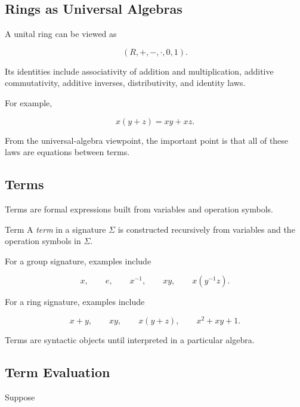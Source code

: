 \subsection{Rings as Universal Algebras}
\label{subsec:rings-universal-algebras}

A unital ring can be viewed as

\[ (R,+,-,\cdot,0,1). \]

Its identities include associativity of addition and multiplication,
additive commutativity, additive inverses, distributivity, and identity
laws.

For example,

\[ x(y+z)=xy+xz. \]

From the universal-algebra viewpoint, the important point is that all of
these laws are equations between terms.

\subsection{Terms}
\label{subsec:universal-terms}

Terms are formal expressions built from variables and operation symbols.

\begin{definitionbox}{Term}
A \emph{term} in a signature \(\Sigma\) is constructed recursively from
variables and the operation symbols in \(\Sigma\).
\end{definitionbox}

For a group signature, examples include

\[ x,\qquad e,\qquad x^{-1},\qquad xy,\qquad x(y^{-1}z). \]

For a ring signature, examples include

\[ x+y,\qquad xy,\qquad x(y+z),\qquad x^2+xy+1. \]

Terms are syntactic objects until interpreted in a particular algebra.

\subsection{Term Evaluation}
\label{subsec:term-evaluation}

Suppose


